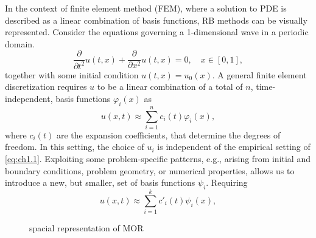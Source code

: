 In the context of finite element method (FEM), where a solution to PDE is described as a linear combination of basis functions, RB methods can be visually represented. Consider the equations governing a 1-dimensional wave in a periodic domain.
\begin{equation} \label{eq:ch1.1}
	\frac{\partial }{\partial t^2} u(t,x) + \frac{\partial }{\partial x^2} u(t,x) = 0, \quad x\in[0,1],
\end{equation}
together with some initial condition $u(t,x) = u_0(x)$. A general finite element discretization requires $u$ to be a linear combination of a total of $n$, time-independent, basis functions $\varphi_i(x)$ as
\begin{equation} \label{eq:ch1.2}
	u(x,t) \approx \sum_{i=1}^n c_i(t) \varphi_i(x),
\end{equation}
where $c_i(t)$ are the expansion coefficients, that determine the degrees of freedom. In this setting, the choice of $u_i$ is independent of the empirical setting of \eqref{eq:ch1.1}. Exploiting some problem-specific patterns, e.g., arising from initial and boundary conditions, problem geometry, or numerical properties, allows us to introduce a new, but smaller, set of basis functions $\psi_i$. Requiring
\begin{equation} \label{eq:ch1.3}
	u(x,t) \approx \sum_{i=1}^k c'_i(t) \psi_i(x),
\end{equation}
\begin{figure} [t]
	\caption{spacial representation of MOR}
	\label{fig:ch1.1}
\end{figure}
